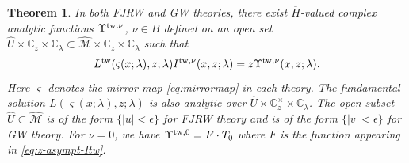 \documentclass[11pt]{amsart}
\newtheorem{thm}{Theorem}[section] %
\theoremstyle{definition} %
\theoremstyle{remark} %
\newcommand{\CC}{\mathbb C}
\newcommand{\tw}{{\rm tw}}
\newcommand{\cM}{\mathcal{M}}
\newcommand{\hcM}{\widehat{\cM}}
\newcommand{\hU}{\widehat{U}}
\newcommand{\ov}{\overline}
\begin{document}
\begin{thm} 
\label{thm:refined-mirrorthm} 
In both FJRW and GW theories, there exist 
$\ov{H}$-valued complex analytic functions 
$\Upsilon^{\tw,\nu}$, $\nu\in B$ defined 
on an open set $\hU \times \CC_z\times \CC_\lambda
\subset \hcM \times \CC_z \times \CC_\lambda$ 
such that 
\begin{equation} 
\label{eq:Itw-Upsilon}
L^{\rm tw}(\varsigma(x;\lambda),z;\lambda) I^{\tw,\nu}(x, z;\lambda) 
= z \Upsilon^{\tw,\nu}(x,z;\lambda).
\end{equation} 
Here $\varsigma$ denotes the mirror map \eqref{eq:mirrormap} 
in each theory. 
The fundamental solution $L(\varsigma(x;\lambda),z;\lambda)$ is also 
analytic over $\hU\times \CC_z^\times \times \CC_\lambda$. 
The open subset $\hU\subset \hcM$ is of the form $\{|u|<\epsilon\}$ 
for FJRW theory and is of the form $\{|v|<\epsilon\}$ for GW theory.  
For $\nu=0$, we have $\Upsilon^{\tw,0} = F\cdot T_0$ 
where $F$ is the function appearing in \eqref{eq:z-asympt-Itw}. 
\end{thm} 
\end{document}
